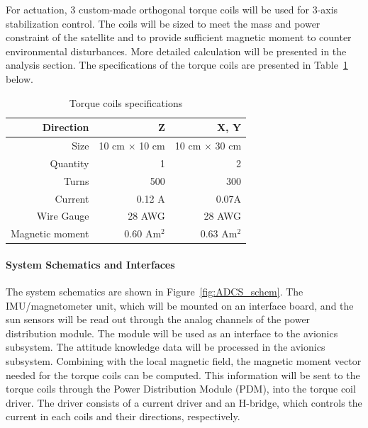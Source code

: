 \documentclass[12pt]{article}
\begin{document}
For actuation, 3 custom-made orthogonal torque coils will be used for 3-axis stabilization control. The coils will be sized to meet the mass and power constraint of the satellite and to provide sufficient magnetic moment to counter environmental disturbances. More detailed calculation will be presented in the analysis section. The specifications of the torque coils are presented in Table~\ref{tab:ADCS_torquecoils} below.
\begin{table}[htbp]
  \centering
  \caption{Torque coils specifications}
    \begin{tabular}{|r|r|r|}
    \hline
    Direction & Z     & X, Y \bigstrut\\
    \hline
    Size  & 10 cm $\times$ 10 cm  & 10 cm $\times$ 30 cm \bigstrut\\
    \hline
    Quantity & 1     & 2 \bigstrut\\
    \hline
    Turns & 500   & 300 \bigstrut\\
    \hline
    Current & 0.12 A & 0.07A \bigstrut\\
    \hline
    Wire Gauge & 28 AWG & 28 AWG \bigstrut\\
    \hline
    Magnetic moment & 0.60 Am$^2$ & 0.63 Am$^2$ \bigstrut\\
    \hline
    \end{tabular}%
  \label{tab:ADCS_torquecoils}%
\end{table}%
				\paragraph{System Schematics and Interfaces}
				The system schematics are shown in Figure~\ref{fig:ADCS_schem}. The IMU/magnetometer unit, which will be mounted on an interface board, and the sun sensors will be read out through the analog channels of the power distribution module. The module will be used as an interface to the avionics subsystem. The attitude knowledge data will be processed in the avionics subsystem. Combining with the local magnetic field, the magnetic moment vector needed for the torque coils can be computed. This information will be sent to the torque coils through the Power Distribution Module (PDM), into the torque coil driver. The driver consists of a current driver and an H-bridge, which controls the current in each coils and their directions, respectively. 
			
\end{document}
